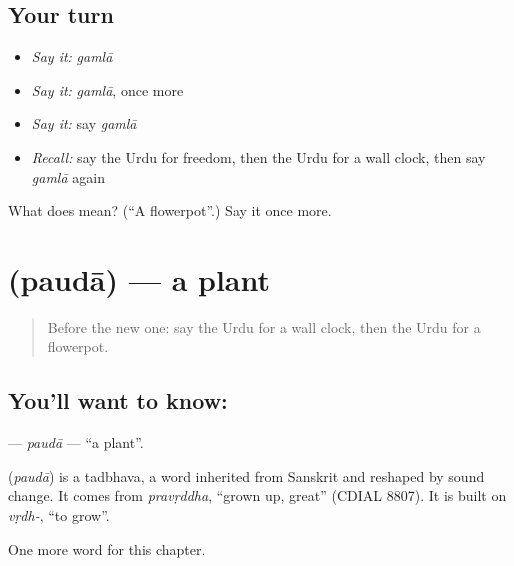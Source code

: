 \subsection*{Your turn}
\begin{itemize}
\raggedright
  \item \emph{Say it:} \emph{gamlā}
  \item \emph{Say it:} \emph{gamlā}, once more
  \item \emph{Say it:} say \emph{gamlā}
  \item \emph{Recall:} say the Urdu for freedom, then the Urdu for a wall clock, then say \emph{gamlā} again
\end{itemize}

\begin{tcolorbox}[breakable,colback=teal!4,colframe=teal!35!black,title={Before you move on}]
What does  mean? (\textquotedblleft{}A flowerpot\textquotedblright{}.) Say it once more.
\end{tcolorbox}
\section[\texorpdfstring{\ur{پودا} (paudā)}{پودا (paudā)}]{ (paudā) — a plant}

\label{lesson:UR-C173-pauda}



\begin{quote}
Before the new one: say the Urdu for a wall clock, then the Urdu for a flowerpot.
\end{quote}

\subsection*{You'll want to know: }
\textbf{} — \emph{paudā} — \textquotedblleft{}a plant\textquotedblright{}.

\begin{cousinweb}
\textbf{} (\emph{paudā}) is a tadbhava, a word inherited from Sanskrit and reshaped by sound change. It comes from \emph{pravṛddha}, \textquotedblleft{}grown up, great\textquotedblright{} (CDIAL 8807). It is built on \emph{vṛdh-}, \textquotedblleft{}to grow\textquotedblright{}.
\end{cousinweb}

\begin{grammarlens}[title={What you've built}]
One more word for this chapter.
\end{grammarlens}

